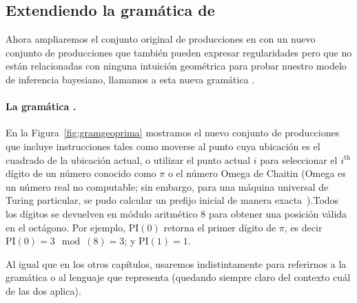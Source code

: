 \subsection{Extendiendo la gramática de \gramgeo}


Ahora ampliaremos el conjunto original de producciones en \gramgeo con un nuevo conjunto de producciones que también pueden expresar regularidades pero que no están relacionadas con ninguna intuición geométrica para probar nuestro modelo de inferencia bayesiano, llamamos a esta nueva gramática \gramgeoprima.


\paragraph{La gramática \gramgeoprima.}

En la Figura~\ref{fig:gramgeoprima} mostramos el nuevo conjunto de producciones que incluye instrucciones tales como moverse al punto cuya ubicación es el cuadrado de la ubicación actual, o utilizar el punto actual $i$ para seleccionar el $i^\text{th}$dígito de un número conocido como $\pi$ o el número Omega de Chaitin (Omega es un número real no computable; sin embargo, para una máquina universal de Turing particular, se pudo calcular un prefijo inicial de manera exacta~\cite{calude2002computing}).Todos los dígitos se devuelven en módulo aritmético 8 para obtener una posición válida en el octágono. Por ejemplo, $\textrm{PI}(0)$ retorna el primer dígito de $\pi$, es decir $\textrm{PI}(0)= 3 \mod({8}) = 3$; y $\textrm{PI}(1) = 1$.


Al igual que en los otros capítulos, usaremos indistintamente \gramgeoprima para referirnos a la gramática o al lenguaje que representa (quedando siempre claro del contexto cuál de las dos aplica).



